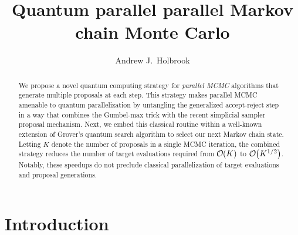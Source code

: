 \documentclass[12pt]{article} %
\title{Quantum parallel parallel Markov chain Monte Carlo}
\date{}
\author{Andrew J.~Holbrook}
\affil{UCLA Biostatistics}
\newcommand{\order}[1]{{\cal O}\hspace{-0.2em}\left( #1 \right)}
\begin{document}
\maketitle




\begin{abstract}

We propose a novel quantum computing strategy for \emph{parallel MCMC} algorithms that generate multiple proposals at each step. This strategy makes parallel MCMC amenable to quantum parallelization by untangling the generalized accept-reject step in a way that combines the Gumbel-max trick with the recent simplicial sampler proposal mechanism.  Next, we embed this classical routine within a well-known extension of Grover's quantum search algorithm to select our next Markov chain state.  Letting $K$ denote the number of proposals in a single MCMC iteration, the combined strategy reduces the number of target evaluations required from $\order{K}$ to $\order{K^{1/2}}$.  Notably, these speedups do not preclude classical parallelization of target evaluations and proposal generations.



\end{abstract}


\section{Introduction}

\newcommand{\ttheta}{\boldsymbol{\theta}}
\newcommand{\dd}{\mbox{d}}
\newcommand{\ppsi}{\boldsymbol{\psi}}
\newcommand{\U}{\mathbf{U}}
\newcommand{\I}{\mathbf{I}}
\renewcommand{\H}{\mathbf{H}}
\newcommand{\A}{\mathbf{A}}
\newcommand{\B}{\mathbf{B}}
\newcommand{\G}{\mathbf{G}}
\newcommand{\ppi}{\boldsymbol{\pi}}
\newcommand{\llambda}{\boldsymbol{\lambda}}
\end{document}
